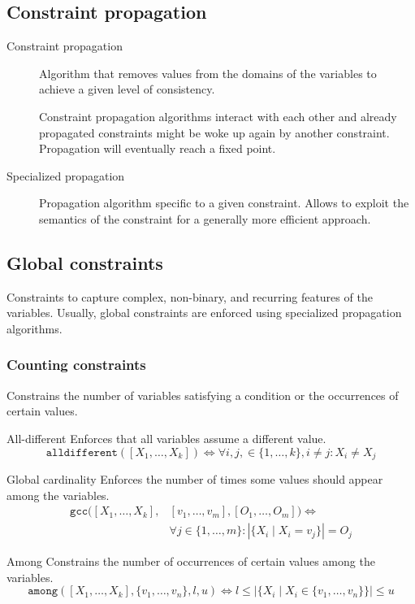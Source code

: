 \subsection{Constraint propagation}

\begin{description}
    \item[Constraint propagation] 
        Algorithm that removes values from the domains of the variables to achieve a given level of consistency.

        Constraint propagation algorithms interact with each other and already propagated constraints might be woke up again by another constraint.
        Propagation will eventually reach a fixed point.


    \item[Specialized propagation] 
        Propagation algorithm specific to a given constraint.
        Allows to exploit the semantics of the constraint for a generally more efficient approach.
\end{description}


\subsection{Global constraints}

Constraints to capture complex, non-binary, and recurring features of the variables.
Usually, global constraints are enforced using specialized propagation algorithms.


\subsubsection{Counting constraints}
Constrains the number of variables satisfying a condition
or the occurrences of certain values.

\begin{descriptionlist}
    \item[All-different] 
        Enforces that all variables assume a different value.
        \[ \texttt{alldifferent}([X_1, \dots, X_k]) \iff \forall i, j, \in \{ 1, \dots, k\}, i \neq j: X_i \neq X_j \]

    \item[Global cardinality]
        Enforces the number of times some values should appear among the variables.
        \[ 
            \begin{split}
                \texttt{gcc}([X_1, \dots, X_k], &[v_1, \dots, v_m], [O_1, \dots, O_m]) \iff \\
                & \forall j \in \{1, \dots, m\}: \left\vert \{ X_i \mid X_i = v_j \} \right\vert = O_j
            \end{split}
        \]

    \item[Among]
        Constrains the number of occurrences of certain values among the variables.
        \[
            \texttt{among}([X_1, \dots, X_k], \{v_1, \dots, v_n\}, l, u) \iff l \leq \left\vert \{ X_i \mid X_i \in \{v_1, \dots, v_n\} \} \right\vert \leq u
        \]
\end{descriptionlist}


